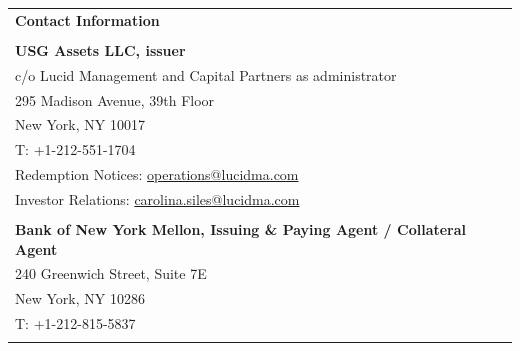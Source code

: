\documentclass[9pt]{article}
\begin{document}
    \begin{center}
        \noindent\begin{tabular}{p{\textwidth}}
                     \rowcolor{lucid_blue}
                     {\color[HTML]{FFFFFF} \textbf{Contact Information}}                          \\
                     \rowcolor[HTML]{EFEFEF}
                     \\
                     \rowcolor[HTML]{EFEFEF}
                     \textbf{USG Assets LLC, issuer}                   \\
                     \rowcolor[HTML]{EFEFEF}
                     c/o Lucid Management and Capital Partners as administrator                                               \\
                     \rowcolor[HTML]{EFEFEF}
                     295 Madison Avenue, 39th Floor                                                           \\
                     \rowcolor[HTML]{EFEFEF}
                     New York, NY 10017                                                           \\
                     \rowcolor[HTML]{EFEFEF}
                     T: +1-212-551-1704                       \\
                     \rowcolor[HTML]{EFEFEF}
                     Redemption Notices: \underline{operations@lucidma.com}                   \\
                     \rowcolor[HTML]{EFEFEF}
                     Investor Relations: \underline{carolina.siles@lucidma.com} \\
                     \rowcolor[HTML]{EFEFEF}
                     \\
                     \rowcolor[HTML]{EFEFEF}
                     \textbf{Bank of New York Mellon, Issuing \& Paying Agent / Collateral Agent}                                                           \\
                     \rowcolor[HTML]{EFEFEF}
                     240 Greenwich Street, Suite 7E                                                           \\
                     \rowcolor[HTML]{EFEFEF}
                     New York, NY 10286                                    \\
                     \rowcolor[HTML]{EFEFEF}
                     T: +1-212-815-5837                                     \\
                     \rowcolor[HTML]{EFEFEF}

\end{tabular}
\end{center}
\end{document}
